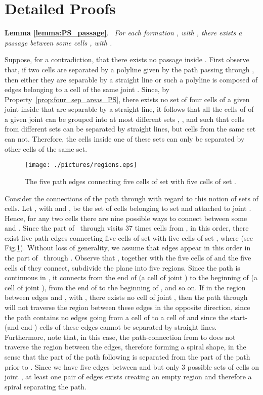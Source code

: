 \documentclass[a4paper,10pt]{llncs}
\newcounter{prop}
\renewenvironment{proof}
{{\bf Proof:}}{\hspace*{\fill}\par\vspace{2mm}}
\newcommand{\rephrase}[3]{\noindent\textbf{#1 #2}.~\emph{#3}}
\renewcommand{\P}{\mbox{ }}
\begin{document}
\section{Detailed Proofs}\label{se:proofs}

\rephrase{Lemma}{\ref{lemma:PS_passage}}{
For each formation , with , there exists a passage between some cells , with .
}

\begin{proof}
Suppose, for a contradiction, that there exists no passage inside . First observe that, if two cells  are separated by a polyline given by the path passing through , then either they are separable by a straight line or such a polyline is composed of edges belonging to a cell  of the same joint . Since, by Property~\ref{prop:four_sep_areas_PS}, there exists no set of four cells of a given joint inside  that are separable by a straight line, it follows that all the cells of  of a given joint can be grouped into at most  different sets , , and  such that cells from different sets can be separated by straight lines, but cells from the same set can not. Therefore, the cells inside one of these sets can only be separated by other cells of the same set.

\begin{figure}[ht]
\begin{center}
\texttt{[image: ./pictures/regions.eps]}
\caption{The five path edges  connecting five cells of set  with five cells of set .}
\label{fig:regions}
\end{center}
\end{figure}

Consider the connections of the path through  with regard to this notion of sets of cells.
Let , with  and , be the set of cells belonging to set  and attached to joint . Hence, for any two cells  there are nine possible ways to connect between some  and .
Since the part of \P through  visits 37 times cells from , in this order, there exist five path edges  connecting five cells of set  with five cells of set , where  (see Fig.\ref{fig:regions}). Without loss of generality, we assume that edges  appear in this order in the part of \P through . Observe that , together with the five cells of  and the five cells of  they connect, subdivide the plane into five regions. Since the path is continuous in , it connects from the end of  (a cell of joint ) to the beginning of  (a cell of joint ), from the end of  to the beginning of , and so on. If in the region between edges  and , with , there exists no cell of joint , then the path through  will not traverse the region between these edges in the opposite direction, since the path contains no edges going from a cell of  to a cell of  and since the start- (and end-) cells of these edges cannot be separated by straight lines.
Furthermore, note that, in this case, the path-connection from  to  does not traverse the region between the edges, therefore forming a spiral shape, in the sense that the part of the path following  is separated from the part of the path prior to .
Since we have five edges between  and  but only 3 possible sets of cells on joint , at least one pair of edges exists creating an empty region and therefore a spiral separating the path.


\end{proof}
\end{document}

